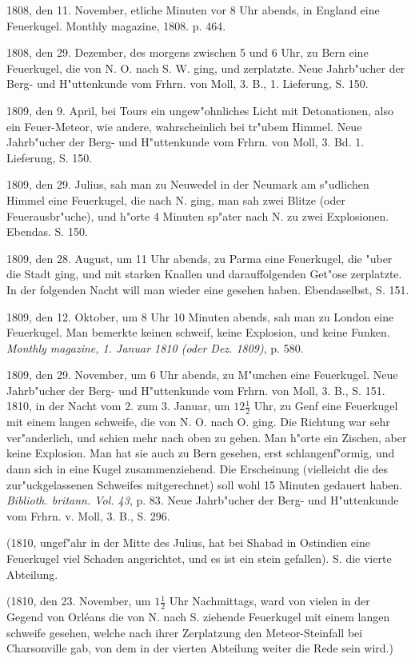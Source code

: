 \documentclass[a4paper, 11pt, oneside, polutonikogreek, german]{article}
\begin{document}
1808, den 11. November, etliche Minuten vor 8 Uhr abends, in England eine Feuerkugel. Monthly magazine, 1808. p. 464.

1808, den 29. Dezember, des morgens zwischen 5 und 6 Uhr, zu Bern eine Feuerkugel, die von N. O. nach S. W. ging, und zerplatzte. Neue Jahrb"ucher der Berg- und H"uttenkunde vom Frhrn. von Moll, 3. B., 1. Lieferung, S. 150.

1809, den 9. April, bei Tours ein ungew"ohnliches Licht mit Detonationen, also ein Feuer-Meteor, wie andere, wahrscheinlich bei tr"ubem Himmel. Neue Jahrb"ucher der Berg- und H"uttenkunde vom Frhrn. von Moll, 3. Bd. 1. Lieferung, S. 150.

1809, den 29. Julius, sah man zu Neuwedel in der Neumark am s"udlichen Himmel eine Feuerkugel, die nach N. ging, man sah zwei Blitze (oder Feuerausbr"uche), und h"orte 4 Minuten sp"ater nach N. zu zwei Explosionen. Ebendas. S. 150.

1809, den 28. August, um 11 Uhr abends, zu Parma eine Feuerkugel, die "uber die Stadt ging, und mit starken Knallen und darauffolgenden Get"ose zerplatzte. In der folgenden Nacht will man wieder eine gesehen haben. Ebendaselbst, S. 151.

1809, den 12. Oktober, um 8 Uhr 10 Minuten abends, sah man zu London eine Feuerkugel. Man bemerkte keinen schweif, keine Explosion, und keine Funken. \emph{Monthly magazine, 1. Januar 1810 (oder Dez. 1809)}, p. 580.

1809, den 29. November, um 6 Uhr abends, zu M"unchen eine Feuerkugel. Neue Jahrb"ucher der Berg- und H"uttenkunde vom Frhrn. von Moll, 3. B., S. 151. 1810, in der Nacht vom 2. zum 3. Januar, um $\mathfrak{12\frac{1}{2}}$ Uhr, zu Genf eine Feuerkugel mit einem langen schweife, die von N. O. nach O. ging. Die Richtung war sehr ver"anderlich, und schien mehr nach oben zu gehen. Man h"orte ein Zischen, aber keine Explosion. Man hat sie auch zu Bern gesehen, erst schlangenf"ormig, und dann sich in eine Kugel zusammenziehend. Die Erscheinung (vielleicht die des zur"uckgelassenen Schweifes mitgerechnet) soll wohl 15 Minuten gedauert haben. \emph{Biblioth. britann. Vol. 43}, p. 83. Neue Jahrb"ucher der Berg- und H"uttenkunde vom Frhrn. v. Moll, 3. B., S. 296.

(1810, ungef"ahr in der Mitte des Julius, hat bei Shabad in Ostindien eine Feuerkugel viel Schaden angerichtet, und es ist ein stein gefallen). S. die vierte Abteilung.

(1810, den 23. November, um $\mathfrak{1\frac{1}{2}}$ Uhr Nachmittags, ward von vielen in der Gegend von Orléans die von N. nach S. ziehende Feuerkugel mit einem langen schweife gesehen, welche nach ihrer Zerplatzung den Meteor-Steinfall bei Charsonville gab, von dem in der vierten Abteilung weiter die Rede sein wird.)
\end{document}
